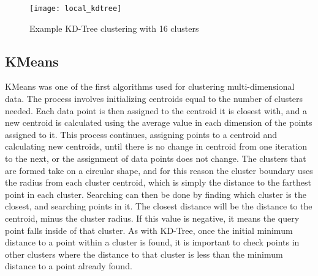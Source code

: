 \documentclass[journal]{IEEEtran}
\begin{document}
\begin{figure}[h]
	\caption{Example KD-Tree clustering with 16 clusters}
	\texttt{[image: local\_kdtree]}
\end{figure}

\subsection{KMeans}
KMeans was one of the first algorithms used for clustering multi-dimensional data. The process involves initializing centroids equal to the number of clusters needed. Each data point is then assigned to the centroid it is closest with, and a new centroid is calculated using the average value in each dimension of the points assigned to it. This process continues, assigning points to a centroid and calculating new centroids, until there is no change in centroid from one iteration to the next, or the assignment of data points does not change. The clusters that are formed take on a circular shape, and for this reason the cluster boundary uses the radius from each cluster centroid, which is simply the distance to the farthest point in each cluster. Searching can then be done by finding which cluster is the closest, and searching points in it. The closest distance will be the distance to the centroid, minus the cluster radius. If this value is negative, it means the query point falls inside of that cluster. As with KD-Tree, once the initial minimum distance to a point within a cluster is found, it is important to check points in other clusters where the distance to that cluster is less than the minimum distance to a point already found. \par
\end{document}
